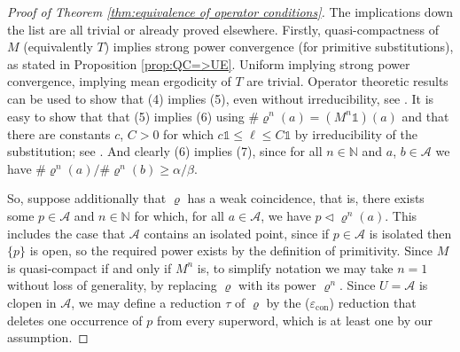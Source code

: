 \documentclass[11pt]{amsart}
\numberwithin{equation}{section}
\theoremstyle{plain}
\theoremstyle{definition}
\newcommand{\N}{{\mathbb N}}
\newcommand{\mc}{\mathcal}
\newcommand{\A}{\mc A}
\newcommand{\sub}{\varrho}
\newcommand{\bbo}{\mathds{1}} %
\begin{document}
\begin{proof}[Proof of Theorem \ref{thm:equivalence of operator conditions}]
The implications down the list are all trivial or already proved elsewhere. Firstly, quasi-compactness of \(M\) (equivalently \(T\)) implies strong power convergence (for primitive substitutions), as stated in Proposition \ref{prop:QC=>UE}. Uniform implying strong power convergence, implying mean ergodicity of \(T\) are trivial. Operator theoretic results can be used to show that (4) implies (5), even without irreducibility, see \cite[Proposition 5.12]{MRW25}. It is easy to show that that (5) implies (6) using \(\# \sub^n(a) = (M^n \bbo)(a)\) and that there are constants \(c\), \(C > 0\) for which \(c \bbo \leq \ell \leq C\bbo\) by irreducibility of the substitution; see \cite[Lemma 4.29]{MRW25}. And clearly (6) implies (7), since for all \(n \in \N\) and \(a\), \(b \in \A\) we have \(\# \sub^n(a) / \# \sub^n(b) \geq \alpha / \beta\).

So, suppose additionally that \(\sub\) has a weak coincidence, that is, there exists some \(p \in \A\) and \(n \in \N\) for which, for all \(a \in \A\), we have \(p \triangleleft \sub^n(a)\). This includes the case that \(\A\) contains an isolated point, since if \(p \in \A\) is isolated then \(\{p\}\) is open, so the required power exists by the definition of primitivity. Since \(M\) is quasi-compact if and only if \(M^n\) is, to simplify notation we may take \(n=1\) without loss of generality, by replacing \(\sub\) with its power \(\sub^n\). Since \(U = \A\) is clopen in \(\A\), we may define a reduction \(\tau\) of \(\sub\) by the (\(\varepsilon_\mathrm{con}\)) reduction that deletes one occurrence of \(p\) from every superword, which is at least one by our assumption.


\end{proof}
\end{document}
